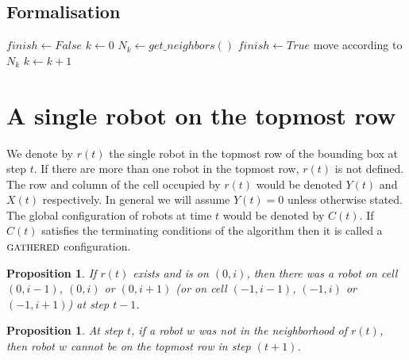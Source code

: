 \documentclass[11pt, a4paper]{article}
\theoremstyle{plain}
\newtheorem{prop}[thm]{Proposition}
\theoremstyle{definition}
\theoremstyle{remark}
\begin{document}
\subsection{Formalisation}
\begin{algorithm}[H]
  $finish \leftarrow False$\;
  $k \leftarrow 0$\;
   {
    $N_k \leftarrow get\_neighbors()$\;
     {
       {
          $finish \leftarrow True$\;
      }
       {
        move according to $N_k$\;
      }
    }
    $k \leftarrow k+1$\;
  }
  \caption{}
\end{algorithm}

\newcommand{\Gathered}{\ensuremath{\textsc{gathered}}\xspace}

\section{A single robot on the topmost row}

We denote by $r(t)$ the single robot in the topmost row of the bounding box at
step $t$. If there are more than one robot in the topmost row, $r(t)$ is not
defined.  The row and column of the cell occupied by $r(t)$ would be denoted
$Y(t)$ and $X(t)$ respectively. In general we will assume $Y(t)=0$ unless
otherwise stated.  The global configuration of robots at time $t$ would be
denoted by $C(t)$. If $C(t)$ satisfies the terminating conditions of the
algorithm then it is called a \Gathered configuration.

\begin{prop}
If $r(t)$ exists and is on $(0,i)$, then there was a robot on cell $(0,i-1)$,
$(0,i)$ or $(0,i+1)$ (or on cell $(-1,i-1)$, $(-1,i)$ or $(-1,i+1)$) at step
$t-1$.
\end{prop}

\begin{prop}
At step $t$, if a robot $w$ was not in the neighborhood of $r(t)$, then robot
$w$ cannot be on the topmost row in step $(t+1)$.  \end{prop}
\end{document}
